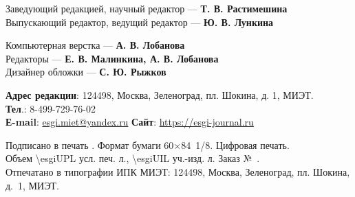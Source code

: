 \noindent
\begin{minipage}[t]{.48\textwidth}
    
    \begin{flushleft}
        \scriptsize
        Заведующий редакцией, научный редактор — \textbf{Т. В. Растимешина}\\
        Выпускающий редактор, ведущий редактор — \textbf{Ю. В. Лункина}
    \end{flushleft}
\end{minipage}\hspace{0.04\textwidth}
\begin{minipage}[t]{.48\textwidth}
    \begin{flushleft}
        \scriptsize
Компьютерная верстка — \textbf{А. В. Лобанова}\\
Редакторы — \textbf{Е. В. Малинкина, А. В. Лобанова}\\
Дизайнер обложки — \textbf{С. Ю. Рыжков}
    \end{flushleft}
\end{minipage}

\begin{flushleft}
    \scriptsize
    \textbf{Адрес редакции}: 124498, Москва, Зеленоград, пл. Шокина, д. 1, МИЭТ.\\
    \textbf{Тел}.: 8-499-729-76-02\\
    \textbf{Е-mail}: \href{mailto:esgi.miet@yandex.ru}{esgi.miet@yandex.ru} \hspace{3em}
    \textbf{Сайт}: \url{https://esgi-journal.ru}

     \vspace{1em}
    Подписано в печать \esgiPDate. Формат бумаги 60\(×\)84 1/8. Цифровая печать.\\
    Объем \num{\esgiUPL} усл. печ. л., \num{\esgiUIL} уч.-изд. л. Заказ № \esgiPRN{}.\\
    Отпечатано в типографии ИПК МИЭТ: 124498, Москва, Зеленоград, пл. Шокина, д. 1, МИЭТ.
\end{flushleft}

\normalsize
\setmainlinespread

\newpage